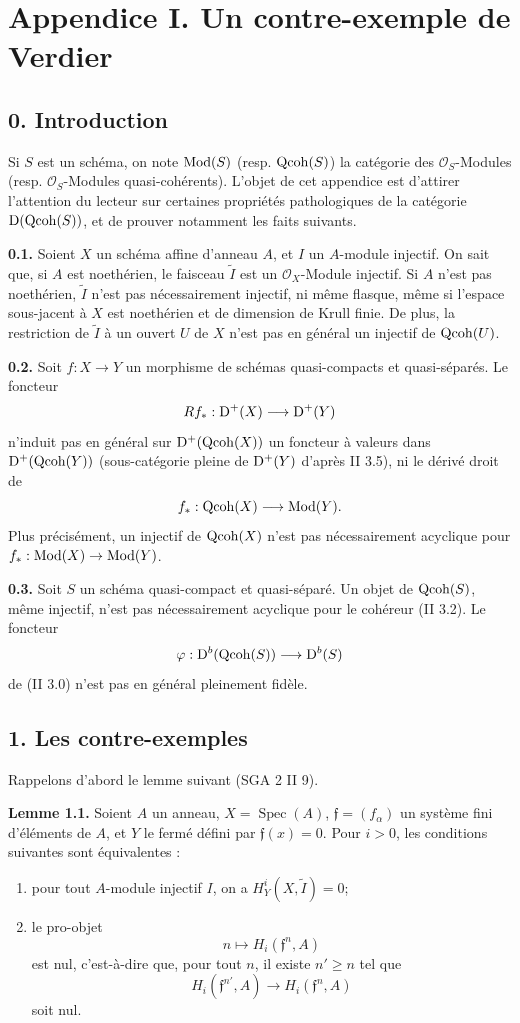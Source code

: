 \documentclass[11pt]{article}
\newcommand{\Spec}{\operatorname{Spec}}
\begin{document}
\section*{Appendice I. Un contre-exemple de Verdier}

\subsection*{0. Introduction}
Si $S$ est un schéma, on note $\operatorname{Mod}(S)$ (resp. $\operatorname{Qcoh}(S)$) la catégorie des $\mathcal O_S$-Modules (resp. $\mathcal O_S$-Modules quasi-cohérents). L'objet de cet appendice est d'attirer l'attention du lecteur sur certaines propriétés pathologiques de la catégorie $\mathrm D(\operatorname{Qcoh}(S))$, et de prouver notamment les faits suivants.

\textbf{0.1.} Soient $X$ un schéma affine d'anneau $A$, et $I$ un $A$-module injectif. On sait que, si $A$ est noethérien, le faisceau $\widetilde I$ est un $\mathcal O_X$-Module injectif. Si $A$ n'est pas noethérien, $\widetilde I$ n'est pas nécessairement injectif, ni même flasque, même si l'espace sous-jacent à $X$ est noethérien et de dimension de Krull finie. De plus, la restriction de $\widetilde I$ à un ouvert $U$ de $X$ n'est pas en général un injectif de $\operatorname{Qcoh}(U)$.

\textbf{0.2.} Soit $f:X\to Y$ un morphisme de schémas quasi-compacts et quasi-séparés. Le foncteur
\[
Rf_*:\mathrm D^+(X)\longrightarrow\mathrm D^+(Y)
\]
n'induit pas en général sur $\mathrm D^+(\operatorname{Qcoh}(X))$ un foncteur à valeurs dans $\mathrm D^+(\operatorname{Qcoh}(Y))$ (sous-catégorie pleine de $\mathrm D^+(Y)$ d'après II 3.5), ni le dérivé droit de
\[
f_*:\operatorname{Qcoh}(X)\longrightarrow\operatorname{Mod}(Y).
\]
Plus précisément, un injectif de $\operatorname{Qcoh}(X)$ n'est pas nécessairement acyclique pour $f_*:\operatorname{Mod}(X)\to\operatorname{Mod}(Y)$.

\textbf{0.3.} Soit $S$ un schéma quasi-compact et quasi-séparé. Un objet de $\operatorname{Qcoh}(S)$, même injectif, n'est pas nécessairement acyclique pour le cohéreur (II 3.2). Le foncteur
\[
\varphi:\mathrm D^b(\operatorname{Qcoh}(S))\longrightarrow\mathrm D^b(S)
\]
de (II 3.0) n'est pas en général pleinement fidèle.

\subsection*{1. Les contre-exemples}

Rappelons d'abord le lemme suivant (SGA 2 II 9).

\textbf{Lemme 1.1.} Soient $A$ un anneau, $X=\Spec(A)$, $\mathfrak f=(f_\alpha)$ un système fini d'éléments de $A$, et $Y$ le fermé défini par $\mathfrak f(x)=0$. Pour $i>0$, les conditions suivantes sont équivalentes :
\begin{enumerate}[label=(\roman*)]
\item pour tout $A$-module injectif $I$, on a $H_Y^i(X,\widetilde I)=0$;
\item le pro-objet
\[
n\longmapsto H_i(\mathfrak f^n,A)
\]
est nul, c'est-à-dire que, pour tout $n$, il existe $n'\geq n$ tel que
\[
H_i(\mathfrak f^{n'},A)\longrightarrow H_i(\mathfrak f^n,A)
\]
soit nul.
\end{enumerate}
\end{document}
